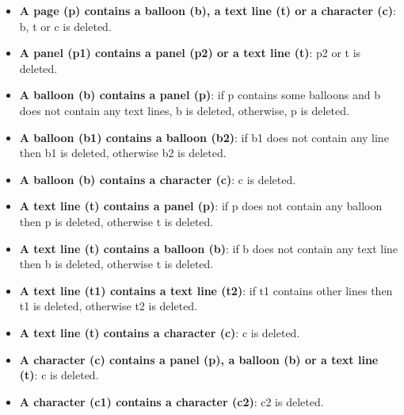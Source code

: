 \begin{itemize}
	\item \textbf{A page (p) contains a balloon (b), a text line (t) or a character (c)}: b, t or c is deleted.
	\item \textbf{A panel (p1) contains a panel (p2) or a text line (t)}: p2 or t is deleted.
 	\item \textbf{A balloon (b) contains a panel (p)}: if p contains some balloons and b does not contain any text lines, b is deleted, otherwise, p is deleted.
	\item \textbf{A balloon (b1) contains a balloon (b2)}: if b1 does not contain any line then b1 is deleted, otherwise b2 is deleted.
	\item \textbf{A balloon (b) contains a character (c)}: c is deleted.
 	\item \textbf{A text line (t) contains a panel (p)}: if p does not contain any balloon then p is deleted, otherwise t is deleted.
 	\item \textbf{A text line (t) contains a balloon (b)}: if b does not contain any text line then b is deleted, otherwise t is deleted.
 	\item \textbf{A text line (t1) contains a text line (t2)}: if t1 contains other lines then t1 is deleted, otherwise t2 is deleted.
 	\item \textbf{A text line (t) contains a character (c)}: c is deleted.
 	\item \textbf{A character (c) contains a panel (p), a balloon (b) or a text line (t)}: c is deleted. 	
 	\item \textbf{A character (c1) contains a character (c2)}: c2 is deleted.
\end{itemize}

